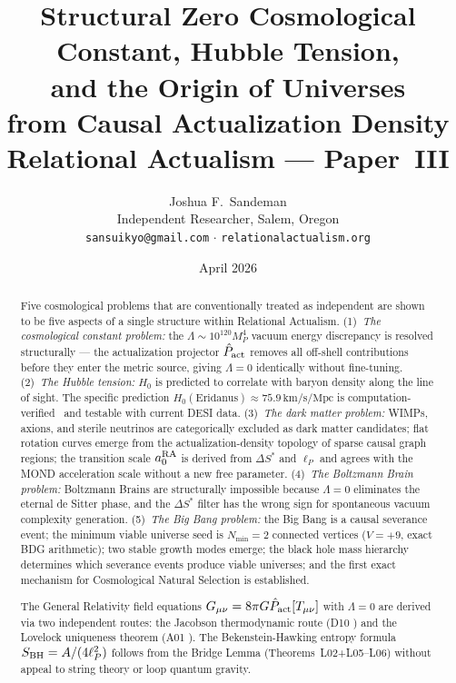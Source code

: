 \documentclass[12pt,a4paper]{article}
\title{\textbf{Structural Zero Cosmological Constant, Hubble Tension,\\
and the Origin of Universes\\
from Causal Actualization Density}\\[0.6em]
\large\normalfont Relational Actualism --- Paper~III}
\author{Joshua F.~Sandeman\\[0.4em]
\small Independent Researcher, Salem, Oregon\\
\small \texttt{sansuikyo@gmail.com} $\cdot$ \texttt{relationalactualism.org}}
\date{April 2026}
\begin{document}
\maketitle

\begin{abstract}
Five cosmological problems that are conventionally treated as independent are shown to be five aspects of a single structure within Relational Actualism.  (1)~\textit{The cosmological constant problem:} the $\Lambda\sim10^{120}M_P^4$ vacuum energy discrepancy is resolved structurally --- the actualization projector $\hat{P}_{\mathrm{act}}$ removes all off-shell contributions before they enter the metric source, giving $\Lambda=0$ identically without fine-tuning.  (2)~\textit{The Hubble tension:} $H_0$ is predicted to correlate with baryon density along the line of sight.  The specific prediction $H_0(\mathrm{Eridanus})\approx75.9\,\mathrm{km/s/Mpc}$ is computation-verified \statusCV\ and testable with current DESI data.  (3)~\textit{The dark matter problem:} WIMPs, axions, and sterile neutrinos are categorically excluded as dark matter candidates; flat rotation curves emerge from the actualization-density topology of sparse causal graph regions; the transition scale $a_0^{\rm RA}$ is derived from $\Delta S^*$ and $\ell_P$ and agrees with the MOND acceleration scale without a new free parameter.  (4)~\textit{The Boltzmann Brain problem:} Boltzmann Brains are structurally impossible because $\Lambda=0$ eliminates the eternal de Sitter phase, and the $\Delta S^*$ filter has the wrong sign for spontaneous vacuum complexity generation.  (5)~\textit{The Big Bang problem:} the Big Bang is a causal severance event; the minimum viable universe seed is $N_{\min}=2$ connected vertices ($V=+9$, exact BDG arithmetic); two stable growth modes emerge; the black hole mass hierarchy determines which severance events produce viable universes; and the first exact mechanism for Cosmological Natural Selection is established.

The General Relativity field equations $G_{\mu\nu}=8\pi G\hat{P}_{\mathrm{act}}[T_{\mu\nu}]$ with $\Lambda=0$ are derived via two independent routes: the Jacobson thermodynamic route (D10 \statusAR) and the Lovelock uniqueness theorem (A01 \statusAR).  The Bekenstein-Hawking entropy formula $S_{\rm BH}=A/(4\ell_P^2)$ follows from the Bridge Lemma (Theorems~L02+L05--L06) without appeal to string theory or loop quantum gravity.
\end{abstract}

\tableofcontents\bigskip
\end{document}
